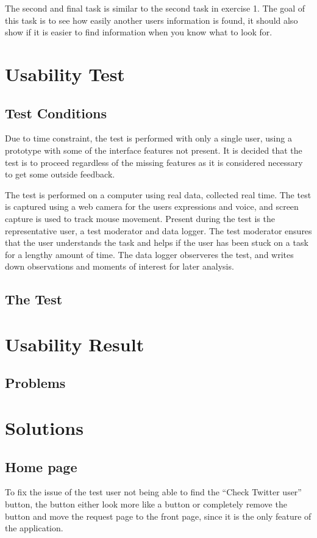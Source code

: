 The second and final task is similar to the second task in exercise 1. The goal
of this task is to see how easily another users information is found, it should
also show if it is easier to find information when you know what to look for.


\section{Usability Test}\label{sec:UXUT}


\subsection{Test Conditions}
Due to time constraint, the test is performed with only a single user,
using a prototype with some of the interface features not present. It is
decided that the test is to proceed regardless of the missing features as it
is considered necessary to get some outside feedback.\nl

The test is performed on a computer using real data, collected real time. The
test is captured using a web camera for the users expressions and voice, and
screen capture is used to track mouse movement. Present during the test is the
representative user, a test moderator and data logger. The test moderator
ensures that the user understands the task and helps if the user has been stuck
on a task for a lengthy amount of time. The data logger observeres the test,
and writes down observations and moments of interest for later analysis.

\subsection{The Test}

\section{Usability Result}\label{sec:UXUR}

\subsection{Problems}

\section{Solutions}

\subsection{Home page}
To fix the issue of the test user not being able to find the ``Check Twitter
user'' button, the button either look more like a button or completely remove
the button and move the request page to the front page, since it is the only
feature of the application.

